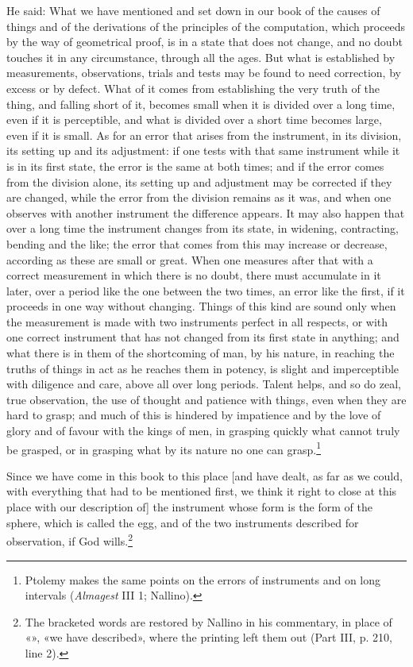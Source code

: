 \documentclass[11pt]{article}
\newcommand{\ArPage}[1]{\marginpar{\footnotesize\color{gray}Ar.\,p.\,#1}}
\begin{document}
\par \ArPage{210}He said: What we have mentioned and set down in our book of the causes of things and of the derivations of the principles of the computation, which proceeds by the way of geometrical proof, is in a state that does not change, and no doubt touches it in any circumstance, through all the ages. But what is established by measurements, observations, trials and tests may be found to need correction, by excess or by defect. What of it comes from establishing the very truth of the thing, and falling short of it, becomes small when it is divided over a long time, even if it is perceptible, and what is divided over a short time becomes large, even if it is small. As for an error that arises from the instrument, in its division, its setting up and its adjustment: if one tests with that same instrument while it is in its first state, the error is the same at both times; and if the error comes from the division alone, its setting up and adjustment may be corrected if they are changed, while the error from the division remains as it was, and when one observes with another instrument the difference appears. It may also happen that over a long time the instrument changes from its state, in widening, contracting, bending and the like; the error that comes from this may increase or decrease, according as these are small or great. When one measures after that with a correct measurement in which there is no doubt, there must accumulate in it later, over a period like the one between the two times, an error like the first, if it proceeds in one way without changing. Things of this kind are sound only when the measurement is made with two instruments perfect in all respects, or with one correct instrument that has not changed from its first state in anything; and what there is in them of the shortcoming of man, by his nature, in reaching the truths of things in act as he reaches them in potency, is slight and imperceptible with diligence and care, above all over long periods. Talent helps, and so do zeal, true observation, the use of thought and patience with things, even when they are hard to grasp; and much of this is hindered by impatience and by the love of glory and of favour with the kings of men, in grasping quickly what cannot truly be grasped, or in grasping what by its nature no one can grasp.\footnote{Ptolemy makes the same points on the errors of instruments and on long intervals (\emph{Almagest} III 1; Nallino).}\par
\par Since we have come in this book to this place [and have dealt, as far as we could, with everything that had to be mentioned first, we think it right to close at this place with our description of] the instrument whose form is the form of the sphere, which is called the egg, and of the two instruments described for observation, if God wills.\footnote{The bracketed words are restored by Nallino in his commentary, in place of «», «we have described», where the printing left them out (Part III, p. 210, line 2).}\par
\end{document}
